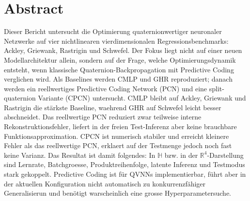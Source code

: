 \section*{Abstract}
Dieser Bericht untersucht die Optimierung quaternionwertiger neuronaler Netzwerke auf vier nichtlinearen vierdimensionalen Regressionsbenchmarks: Ackley, Griewank, Rastrigin und Schwefel. Der Fokus liegt nicht auf einer neuen Modellarchitektur allein, sondern auf der Frage, welche Optimierungsdynamik entsteht, wenn klassische Quaternion-Backpropagation mit Predictive Coding verglichen wird. Als Baselines werden CMLP und GHR reproduziert; danach werden ein reellwertiges Predictive Coding Network (PCN) und eine split-quaternion Variante (CPCN) untersucht. CMLP bleibt auf Ackley, Griewank und Rastrigin die stärkste Baseline, waehrend GHR auf Schwefel leicht besser abschneidet. Das reellwertige PCN reduziert zwar teilweise interne Rekonstruktionsfehler, liefert in der freien Test-Inferenz aber keine brauchbare Funktionsapproximation. CPCN ist numerisch stabiler und erreicht kleinere Fehler als das reellwertige PCN, erklaert auf der Testmenge jedoch noch fast keine Varianz. Das Resultat ist damit folgendes: In $\mathbb{H}$ bzw. in der $\mathbb{R}^4$-Darstellung sind Lernrate, Batchgroesse, Produktreihenfolge, latente Inferenz und Testmodus stark gekoppelt. Predictive Coding ist für QVNNs implementierbar, führt aber in der aktuellen Konfiguration nicht automatisch zu konkurrenzfähiger Generalisierun und benötigt warscheinlich eine grosse Hyperparametersuche.
\vspace{2ex}
